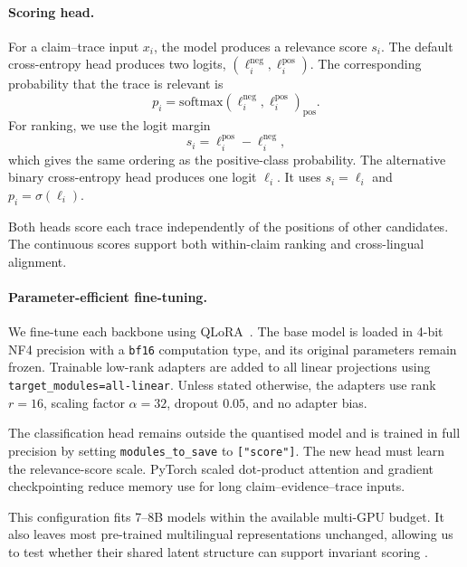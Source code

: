 \paragraph{Scoring head.}
For a claim--trace input $x_i$, the model produces a relevance score $s_i$. The default
cross-entropy head produces two logits,
$(\ell^{\text{neg}}_i,\ell^{\text{pos}}_i)$. The corresponding probability that the trace is
relevant is
\[
p_i =
\mathrm{softmax}
\left(\ell^{\text{neg}}_i,\ell^{\text{pos}}_i\right)_{\text{pos}}.
\]
For ranking, we use the logit margin
\[
s_i=\ell^{\text{pos}}_i-\ell^{\text{neg}}_i,
\]
which gives the same ordering as the positive-class probability. The alternative binary
cross-entropy head produces one logit $\ell_i$. It uses $s_i=\ell_i$ and
$p_i=\sigma(\ell_i)$.

Both heads score each trace independently of the positions of other candidates. The continuous scores
support both within-claim ranking and cross-lingual alignment.

\paragraph{Parameter-efficient fine-tuning.}
We fine-tune each backbone using QLoRA~\cite{dettmers2023qloraefficientfinetuningquantized,
hu2021loralowrankadaptationlarge}. The base model is loaded in 4-bit NF4 precision with a
\texttt{bf16} computation type, and its original parameters remain frozen. Trainable low-rank
adapters are added to all linear projections using
\texttt{target\_modules=all-linear}. Unless stated otherwise, the adapters use rank $r=16$, scaling
factor $\alpha=32$, dropout $0.05$, and no adapter bias.

The classification head remains outside the quantised model and is trained in full precision by
setting \texttt{modules\_to\_save} to \texttt{["score"]}. The new head must learn the relevance-score
scale. PyTorch scaled dot-product attention and gradient checkpointing reduce memory use for long
claim--evidence--trace inputs.

This configuration fits 7--8B models within the available multi-GPU budget. It also leaves most
pre-trained multilingual representations unchanged, allowing us to test whether their shared latent
structure can support invariant scoring
\cite{wendler2024llamasworkenglishlatent,schut2025multilingualllmsthinkenglish}.

